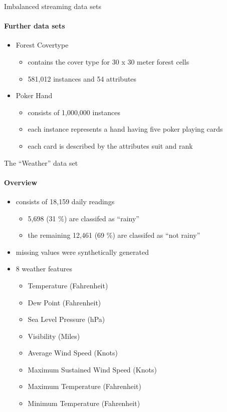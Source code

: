 
\begin{frame}{Imbalanced streaming data sets}
\framesubtitle{Further data sets}

\begin{itemize}
    \item Forest Covertype
    \begin{itemize}
        \item contains the cover type for 30 x 30 meter forest cells
        \item 581,012 instances and 54 attributes
    \end{itemize}
    \item Poker Hand
    \begin{itemize}
        \item consists of 1,000,000 instances
        \item each instance represents a hand having five poker playing cards
        \item each card is described by the attributes suit and rank
    \end{itemize}
\end{itemize}

\end{frame}


\begin{frame}{The \enquote{Weather} data set}
\framesubtitle{Overview}

\begin{itemize}
    \item consists of 18,159 daily readings
    \begin{itemize}
        \item 5,698 (31 \%) are classifed as \enquote{rainy}
        \item the remaining 12,461 (69 \%) are classifed as \enquote{not rainy}
    \end{itemize}
    \item missing values were synthetically generated
    \item 8 weather features
    \begin{itemize}
        \item Temperature (Fahrenheit)
        \item Dew Point (Fahrenheit)
        \item Sea Level Pressure (hPa)
        \item Visibility (Miles)
        \item Average Wind Speed (Knots)
        \item Maximum Sustained Wind Speed (Knots)
        \item Maximum Temperature (Fahrenheit)
        \item Minimum Temperature (Fahrenheit)
    \end{itemize}
\end{itemize}

\end{frame}

